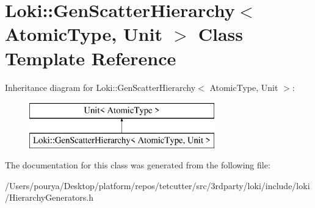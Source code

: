 \hypertarget{classLoki_1_1GenScatterHierarchy}{}\section{Loki\+:\+:Gen\+Scatter\+Hierarchy$<$ Atomic\+Type, Unit $>$ Class Template Reference}
\label{classLoki_1_1GenScatterHierarchy}
Inheritance diagram for Loki\+:\+:Gen\+Scatter\+Hierarchy$<$ Atomic\+Type, Unit $>$\+:\begin{figure}[H]
\begin{center}
\leavevmode
\includegraphics[height=2.000000cm]{classLoki_1_1GenScatterHierarchy}
\end{center}
\end{figure}


The documentation for this class was generated from the following file\+:\begin{DoxyCompactItemize}
\item 
/\+Users/pourya/\+Desktop/platform/repos/tetcutter/src/3rdparty/loki/include/loki/Hierarchy\+Generators.\+h\end{DoxyCompactItemize}

